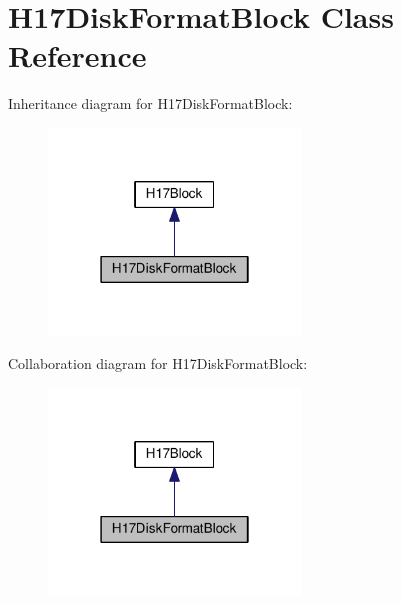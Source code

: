 \hypertarget{classH17DiskFormatBlock}{}\section{H17\+Disk\+Format\+Block Class Reference}
\label{classH17DiskFormatBlock}


Inheritance diagram for H17\+Disk\+Format\+Block\+:
\nopagebreak
\begin{figure}[H]
\begin{center}
\leavevmode
\includegraphics[width=190pt]{classH17DiskFormatBlock__inherit__graph}
\end{center}
\end{figure}


Collaboration diagram for H17\+Disk\+Format\+Block\+:
\nopagebreak
\begin{figure}[H]
\begin{center}
\leavevmode
\includegraphics[width=190pt]{classH17DiskFormatBlock__coll__graph}
\end{center}
\end{figure}
